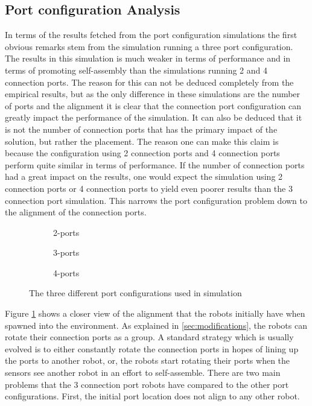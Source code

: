 \subsection{Port configuration Analysis}
In terms of the results fetched from the port configuration simulations the first obvious remarks stem from the simulation running a three port configuration.
The results in this simulation is much weaker in terms of performance and in terms of promoting self-assembly than the simulations running 2 and 4 connection ports.
The reason for this can not be deduced completely from the empirical results, but as the only difference in these simulations are the number of ports and the alignment it is clear that the connection port configuration can greatly impact the performance of the simulation.
It can also be deduced that it is not the number of connection ports that has the primary impact of the solution, but rather the placement.
The reason one can make this claim is because the configuration using 2 connection ports and 4 connection ports perform quite similar in terms of performance.
If the number of connection ports had a great impact on the results, one would expect the simulation using 2 connection ports or 4 connection ports to yield even poorer results than the 3 connection port simulation.
This narrows the port configuration problem down to the alignment of the connection ports.

\begin{figure}[H]
	\centering
	\begin{subfigure}[b]{0.31\textwidth}
		\centering
		\caption{2-ports}
	\end{subfigure}
	\begin{subfigure}[b]{0.31\textwidth}
		\centering
		\caption{3-ports}
	\end{subfigure}
	\begin{subfigure}[b]{0.31\textwidth}
		\centering
		\caption{4-ports}
	\end{subfigure}
	\caption{The three different port configurations used in simulation}
	\label{fig:robot-port-configuration}
\end{figure}

Figure \ref{fig:robot-port-configuration} shows a closer view of the alignment that the robots initially have when spawned into the environment.
As explained in \ref{sec:modifications}, the robots can rotate their connection ports as a group.
A standard strategy which is usually evolved is to either constantly rotate the connection ports in hopes of lining up the ports to another robot, or, the robots start rotating their ports when the sensors see another robot in an effort to self-assemble.
There are two main problems that the 3 connection port robots have compared to the other port configurations.
First, the initial port location does not align to any other robot.


